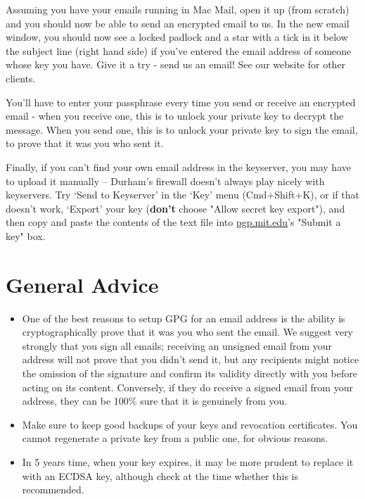 \begin{compactenum}[1.]
  \item Assuming you have your emails running in Mac Mail, open it up (from scratch) and you should now be able to send an encrypted email to us. In the new email window, you should now see a locked padlock and a star with a tick in it below the subject line (right hand side) if you've entered the email address of someone whose key you have. Give it a try - send us an email! See our website for other clients.
  \item You'll have to enter your passphrase every time you send or receive an encrypted email - when you receive one, this is to unlock your private key to decrypt the message. When you send one, this is to unlock your private key to sign the email, to prove that it was you who sent it.
    \item Finally, if you can't find your own email address in the keyserver, you may have to upload it manually -- Durham's firewall doesn't always play nicely with keyservers. Try `Send to Keyserver' in the `Key' menu (Cmd+Shift+K), or if that doesn't work, `Export' your key (\textbf{don't} choose "Allow secret key export"), and then copy and paste the contents of the text file into \href{http://pgp.mit.edu}{pgp.mit.edu}'s "Submit a key" box.
\end{compactenum}%


\section{General Advice}

\begin{itemize}
    \item One of the best reasons to setup GPG for an email address is the ability is cryptographically prove that it was you who sent the email. We suggest very strongly that you sign all emails; receiving an unsigned email from your address will not prove that you didn't send it, but any recipients might notice the omission of the signature and confirm its validity directly with you before acting on its content. Conversely, if they do receive a signed email from your address, they can be 100\% sure that it is genuinely from you.
    \item Make sure to keep good backups of your keys and revocation certificates. You cannot regenerate a private key from a public one, for obvious reasons.
    \item In 5 years time, when your key expires, it may be more prudent to replace it with an ECDSA key, although check at the time whether this is recommended.
\end{itemize}


